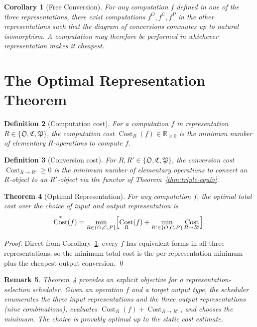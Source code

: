 \documentclass[twocolumn,a4paper]{article}
\newtheorem{theorem}{Theorem}[section]
\newtheorem{corollary}[theorem]{Corollary}
\newtheorem{definition}[theorem]{Definition}
\newtheorem{remark}[theorem]{Remark}
\DeclareMathOperator{\Conv}{Cost}
\newcommand{\Real}{\mathbb{R}}
\newcommand{\OOsc}{\mathfrak{O}}
\newcommand{\CCat}{\mathfrak{C}}
\newcommand{\PPart}{\mathfrak{P}}
\begin{document}
\begin{corollary}[Free Conversion]
\label{cor:free-conversion}
For any computation $f$ defined in one of the three representations, there exist computations $f^{O},f^{C},f^{P}$ in the other representations such that the diagram of conversions commutes up to natural isomorphism. A computation may therefore be performed in whichever representation makes it cheapest.
\end{corollary}

\section{The Optimal Representation Theorem}
\label{sec:opt-rep}

\begin{definition}[Computation cost]
\label{def:comp-cost}
For a computation $f$ in representation $R\in\{\OOsc,\CCat,\PPart\}$, the \emph{computation cost} $\Conv_{R}(f)\in\Real_{\geq 0}$ is the minimum number of elementary $R$-operations to compute $f$.
\end{definition}

\begin{definition}[Conversion cost]
\label{def:conv-cost}
For $R,R'\in\{\OOsc,\CCat,\PPart\}$, the \emph{conversion cost} $\Conv_{R\to R'}\geq 0$ is the minimum number of elementary operations to convert an $R$-object to an $R'$-object via the functor of Theorem~\ref{thm:triple-equiv}.
\end{definition}

\begin{theorem}[Optimal Representation]
\label{thm:opt-rep}
For any computation $f$, the optimal total cost over the choice of input and output representation is
\[
\Conv^{*}(f)=\min_{R\in\{O,C,P\}}\Bigl[\Conv_{R}(f)+\min_{R'\in\{O,C,P\}}\Conv_{R\to R'}\Bigr].
\]
\end{theorem}

\begin{proof}
Direct from Corollary~\ref{cor:free-conversion}: every $f$ has equivalent forms in all three representations, so the minimum total cost is the per-representation minimum plus the cheapest output conversion. \qed
\end{proof}

\begin{remark}
\label{rem:opt-rep-implementation}
Theorem~\ref{thm:opt-rep} provides an explicit objective for a representation-selection scheduler. Given an operation $f$ and a target output type, the scheduler enumerates the three input representations and the three output representations (nine combinations), evaluates $\Conv_{R}(f)+\Conv_{R\to R'}$, and chooses the minimum. The choice is provably optimal up to the static cost estimate.
\end{remark}
\end{document}
